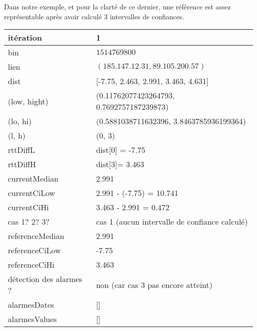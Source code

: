 Dans notre exemple,  et pour la clarté de ce dernier, une référence est assez représentable après avoir calculé 3 intervalles de confiances. 
\newpage
	\begin{table}[H]
		\centering

		\begin{tabularx}{\linewidth}{|l|X| }
		\hline
itération & 1	\\ \hline
bin & $1514769800$ \\ \hline
lien & $(185.147.12.31, 89.105.200.57)$  \\ \hline
dist& [-7.75, 2.463, 2.991, 3.463, 4.631]	\\ \hline
(low, hight)& (0.11762077423264793, 0.7692757187239873) 	\\ \hline
(lo, hi)&(0.5881038711632396, 3.8463785936199364)  \\ \hline
(l, h) & (0, 3) 	\\ \hline
rttDiffL& dist[0] = -7.75	\\ \hline
rttDiffH& dist[3]= 3.463	\\ \hline
currentMedian& 2.991	\\ \hline
currentCiLow&  2.991 - (-7.75) = 10.741 	\\ \hline
currentCiHi& 3.463 - 2.991 =  0.472	\\ \hline
cas 1? 2? 3?& cas 1 (aucun intervalle de confiance calculé)  \\ \hline
referenceMedian& 2.991	\\ \hline
referenceCiLow& -7.75	\\ \hline
referenceCiHi&3.463	\\ \hline
détection des alarmes ?& non (car cas 3 pas  encore atteint)	\\ \hline
alarmesDates& []	\\ \hline
alarmesValues& []	\\ \hline
		
			
		\end{tabularx}
	\end{table}


